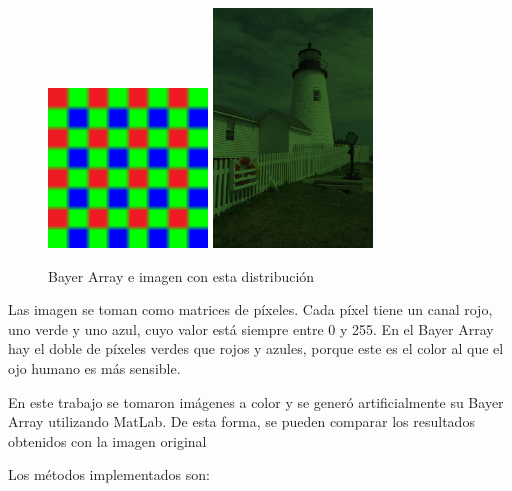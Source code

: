 \documentclass[a4paper]{article}
\begin{document}
\begin{figure}[htbp]
\centering
\includegraphics[width=120pt]{img/BA.png}
\includegraphics[width=120pt]{img/img8b.png}
\caption{Bayer Array e imagen con esta distribución}
\end{figure}

Las imagen se toman como matrices de píxeles. Cada píxel tiene un canal rojo, uno verde y uno azul, cuyo valor está siempre entre 0 y 255. En el Bayer Array hay el doble de píxeles verdes que rojos y azules, porque este es el color al que el ojo humano es más sensible.

En este trabajo se tomaron imágenes a color y se generó artificialmente su Bayer Array utilizando MatLab. De esta forma, se pueden comparar los resultados obtenidos con la imagen original%

Los métodos implementados son:\\
\end{document}

